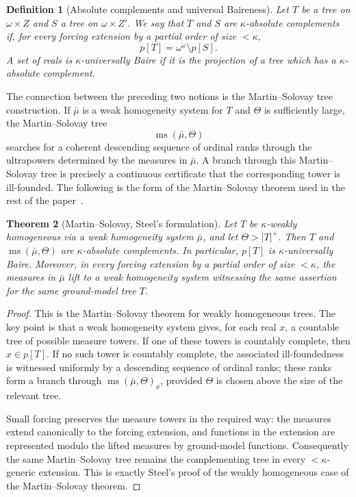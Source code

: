 \documentclass[a4paper,11pt]{article}
\newtheorem{theorem}{Theorem}[section]
\newtheorem{definition}[theorem]{Definition}
\begin{document}
\begin{definition}[Absolute complements and universal Baireness]\label{def:absolute-complements}
Let $T$ be a tree on $\omega\times Z$ and $S$ a tree on $\omega\times Z'$.  We say that $T$ and $S$ are \emph{$\kappa$-absolute complements} if, for every forcing extension by a partial order of size $<\kappa$,
\[
   p[T]=\omega^\omega\setminus p[S].
\]
A set of reals is \emph{$\kappa$-universally Baire} if it is the projection of a tree which has a $\kappa$-absolute complement.
\end{definition}

The connection between the preceding two notions is the Martin--Solovay tree construction.  If $\bar\mu$ is a weak homogeneity system for $T$ and $\Theta$ is sufficiently large, the Martin--Solovay tree
\[
   \operatorname{ms}(\bar\mu,\Theta)
\]
searches for a coherent descending sequence of ordinal ranks through the ultrapowers determined by the measures in $\bar\mu$.  A branch through this Martin--Solovay tree is precisely a continuous certificate that the corresponding tower is ill-founded.  The following is the form of the Martin--Solovay theorem used in the rest of the paper~\cite[Theorem~2.20 and Corollary~2.21]{steel2009derived}.

\begin{theorem}[Martin--Solovay, Steel's formulation]\label{thm:ms-weak-homogeneous-ub}
Let $T$ be $\kappa$-weakly homogeneous via a weak homogeneity system $\bar\mu$, and let $\Theta>|T|^+$.  Then $T$ and $\operatorname{ms}(\bar\mu,\Theta)$ are $\kappa$-absolute complements.  In particular, $p[T]$ is $\kappa$-universally Baire.  Moreover, in every forcing extension by a partial order of size $<\kappa$, the measures in $\bar\mu$ lift to a weak homogeneity system witnessing the same assertion for the same ground-model tree $T$.
\end{theorem}

\begin{proof}
This is the Martin--Solovay theorem for weakly homogeneous trees.  The key point is that a weak homogeneity system gives, for each real $x$, a countable tree of possible measure towers.  If one of these towers is countably complete, then $x\in p[T]$.  If no such tower is countably complete, the associated ill-foundedness is witnessed uniformly by a descending sequence of ordinal ranks; these ranks form a branch through $\operatorname{ms}(\bar\mu,\Theta)_x$, provided $\Theta$ is chosen above the size of the relevant tree.

Small forcing preserves the measure towers in the required way: the measures extend canonically to the forcing extension, and functions in the extension are represented modulo the lifted measures by ground-model functions.  Consequently the same Martin--Solovay tree remains the complementing tree in every $<\kappa$-generic extension.  This is exactly Steel's proof of the weakly homogeneous case of the Martin--Solovay theorem.
\end{proof}
\end{document}
